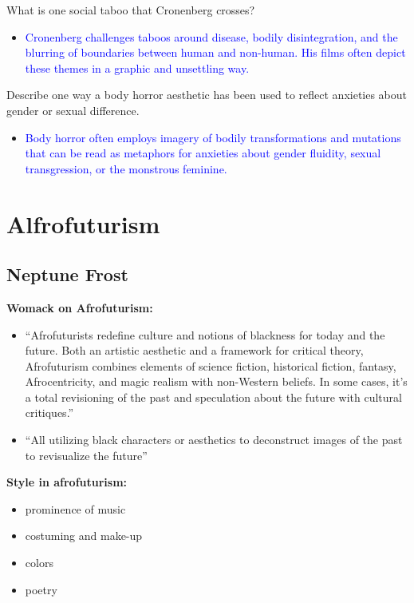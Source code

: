 \documentclass[11pt,fleqn]{book} %
\begin{document}
\begin{exercise}
What is one social taboo that Cronenberg crosses?
\begin{itemize}
    \item \textcolor{blue}{Cronenberg challenges taboos around disease, bodily disintegration, and the blurring of boundaries between human and non-human. His films often depict these themes in a graphic and unsettling way.}
\end{itemize}
\end{exercise}

\begin{exercise}
Describe one way a body horror aesthetic has been used to reflect anxieties about gender or sexual difference.
\begin{itemize}
    \item \textcolor{blue}{Body horror often employs imagery of bodily transformations and mutations that can be read as metaphors for anxieties about gender fluidity, sexual transgression, or the monstrous feminine.}
\end{itemize}
\end{exercise}







\section{Alfrofuturism}
\subsection{Neptune Frost}
\textbf{Womack on Afrofuturism: }
\begin{itemize}
    \item \enquote{Afrofuturists redefine culture and
notions of blackness for today and the
future. Both an artistic aesthetic and a
framework for critical theory, Afrofuturism
combines elements of science fiction,
historical fiction, fantasy, Afrocentricity,
and magic realism with non-Western
beliefs. In some cases, it's a total
revisioning of the past and speculation
about the future with cultural critiques.}
    \item \enquote{All utilizing black
characters or aesthetics
to deconstruct images of
the past to revisualize
the future}
\end{itemize}

\textbf{Style in afrofuturism: }
\begin{itemize}
    \item prominence of music
    \item costuming and make-up
    \item colors
    \item poetry
\end{itemize}
\end{document}
